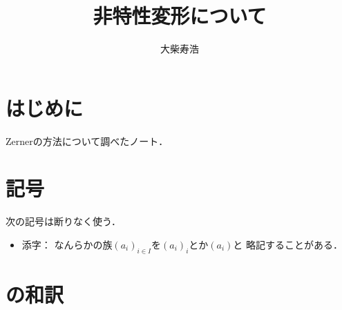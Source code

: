 \theoremstyle{mystyle}
\newtheorem{AXM}{公理}[section]
\newtheorem{DFN}[Axiom]{定義}
\newtheorem{THM}[Axiom]{定理}
\newtheorem*{THM*}{定理}
\newtheorem{PRP}[Axiom]{命題}
\newtheorem{LMM}[Axiom]{補題}
\newtheorem{CRL}[Axiom]{系}
\newtheorem{EG}[Axiom]{例}
\newtheorem{CNV}[Axiom]{規約}
\newtheorem{NTN}[Axiom]{記号}
\newtheorem{CMT}[Axiom]{コメント}
\newtheorem{RMK}[Axiom]{注意}






\def\inner<#1>{\langle #1 \rangle}








\title{非特性変形について}
\author{大柴寿浩}
\date{}

\maketitle

\section*{はじめに}
Zernerの方法について調べたノート．
\section*{記号}
次の記号は断りなく使う．
\begin{itemize}
    \item 添字：
    なんらかの族$(a_i)_{i\in I}$を$(a_i)_i$とか$(a_i)$と
    略記することがある．
\end{itemize}
\section{\cite[1--2章]{Sch00}の和訳}
